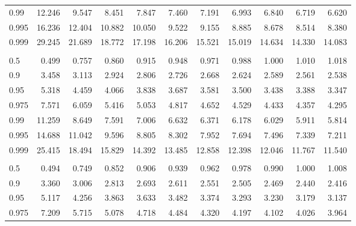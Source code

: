\documentclass[
]{article}
\begin{document}
\begin{table}[H]
\begin{tabular}{lrrrrrrrrrr}
\hspace{1em}0.99 & 12.246 & 9.547 & 8.451 & 7.847 & 7.460 & 7.191 & 6.993 & 6.840 & 6.719 & 6.620\\
\hspace{1em}0.995 & 16.236 & 12.404 & 10.882 & 10.050 & 9.522 & 9.155 & 8.885 & 8.678 & 8.514 & 8.380\\
\hspace{1em}0.999 & 29.245 & 21.689 & 18.772 & 17.198 & 16.206 & 15.521 & 15.019 & 14.634 & 14.330 & 14.083\\
\addlinespace[0.3em]
\multicolumn{11}{l}{\textbf{$k_2=8$}}\\
\hspace{1em}0.5 & 0.499 & 0.757 & 0.860 & 0.915 & 0.948 & 0.971 & 0.988 & 1.000 & 1.010 & 1.018\\
\hspace{1em}0.9 & 3.458 & 3.113 & 2.924 & 2.806 & 2.726 & 2.668 & 2.624 & 2.589 & 2.561 & 2.538\\
\hspace{1em}0.95 & 5.318 & 4.459 & 4.066 & 3.838 & 3.687 & 3.581 & 3.500 & 3.438 & 3.388 & 3.347\\
\hspace{1em}0.975 & 7.571 & 6.059 & 5.416 & 5.053 & 4.817 & 4.652 & 4.529 & 4.433 & 4.357 & 4.295\\
\hspace{1em}0.99 & 11.259 & 8.649 & 7.591 & 7.006 & 6.632 & 6.371 & 6.178 & 6.029 & 5.911 & 5.814\\
\hspace{1em}0.995 & 14.688 & 11.042 & 9.596 & 8.805 & 8.302 & 7.952 & 7.694 & 7.496 & 7.339 & 7.211\\
\hspace{1em}0.999 & 25.415 & 18.494 & 15.829 & 14.392 & 13.485 & 12.858 & 12.398 & 12.046 & 11.767 & 11.540\\
\addlinespace[0.3em]
\multicolumn{11}{l}{\textbf{$k_2=9$}}\\
\hspace{1em}0.5 & 0.494 & 0.749 & 0.852 & 0.906 & 0.939 & 0.962 & 0.978 & 0.990 & 1.000 & 1.008\\
\hspace{1em}0.9 & 3.360 & 3.006 & 2.813 & 2.693 & 2.611 & 2.551 & 2.505 & 2.469 & 2.440 & 2.416\\
\hspace{1em}0.95 & 5.117 & 4.256 & 3.863 & 3.633 & 3.482 & 3.374 & 3.293 & 3.230 & 3.179 & 3.137\\
\hspace{1em}0.975 & 7.209 & 5.715 & 5.078 & 4.718 & 4.484 & 4.320 & 4.197 & 4.102 & 4.026 & 3.964\\

\end{tabular}
\end{table}
\end{document}
